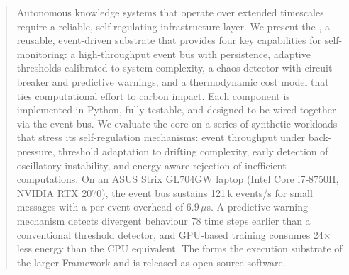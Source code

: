 \begin{abstract}
Autonomous knowledge systems that operate over extended timescales require a
reliable, self-regulating infrastructure layer.  We present the \Core{}, a
reusable, event-driven substrate that provides four key capabilities for
self-monitoring: a high-throughput event bus with persistence, adaptive
thresholds calibrated to system complexity, a chaos detector with circuit
breaker and predictive warnings, and a thermodynamic cost model that ties
computational effort to carbon impact.  Each component is implemented in
Python, fully testable, and designed to be wired together via the event bus.
We evaluate the core on a series of synthetic workloads that stress its
self-regulation mechanisms: event throughput under back-pressure, threshold
adaptation to drifting complexity, early detection of oscillatory instability,
and energy-aware rejection of inefficient computations.  On an ASUS Strix
GL704GW laptop (Intel Core i7‑8750H, NVIDIA RTX 2070), the event bus
sustains 121\,k events/s for small messages with a per‑event overhead of
$6.9\,\mu$s.  A predictive warning mechanism detects divergent behaviour 78
time steps earlier than a conventional threshold detector, and GPU‑based
training consumes 24$\times$ less energy than the CPU equivalent.  The
\Core{} forms the execution substrate of the larger \Apeiron{} Framework and
is released as open-source software.
\end{abstract}